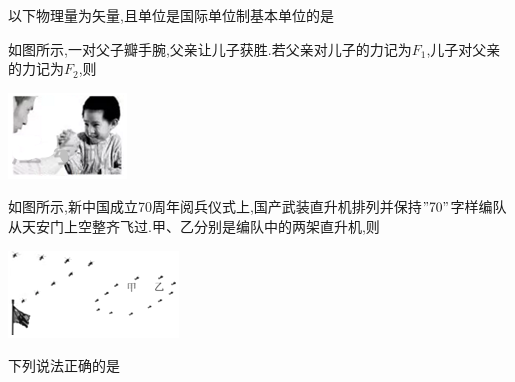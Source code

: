 \question[6]以下物理量为矢量,且单位是国际单位制基本单位的是\key{}
\begin{solution}{4cm}

\end{solution}



\question[6]如图所示,一对父子瓣手腕,父亲让儿子获胜.若父亲对儿子的力记为$F_1$,儿子对父亲的力记为$F_2$,则\key{}\begin{center}\includegraphics[]{img/image1.png}\end{center}
\begin{solution}{4cm}

\end{solution}



\question[6]如图所示,新中国成立70周年阅兵仪式上,国产武装直升机排列并保持$"70"$字样编队从天安门上空整齐飞过.甲、乙分别是编队中的两架直升机,则\key{}\begin{center}\includegraphics[]{img/image2.png}\end{center}
\begin{solution}{4cm}

\end{solution}



\question[6]下列说法正确的是\key{}
\begin{solution}{4cm}

\end{solution}



